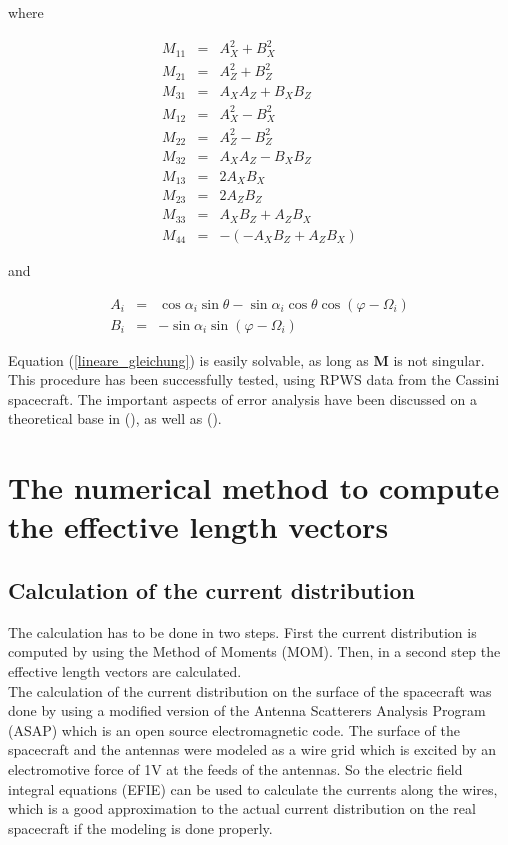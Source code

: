 \documentclass[galley,ras]{agu2001}
\begin{document}
\begin{article}
where

\begin{eqnarray}
  M_{11} &=& A^2_X+ B^2_X \\
M_{21} &=& A^2_Z+ B^2_Z \\
M_{31} &=& A_X A_Z +  B_X B_Z \\
M_{12} &=& A^2_X- B^2_X \\
M_{22} &=& A^2_Z- B^2_Z \\
M_{32} &=& A_X A_Z - B_X B_Z \\
M_{13} &=& 2 A_X B_X \\
M_{23} &=& 2 A_Z B_Z \\
M_{33} &=& A_X B_Z + A_Z B_X \\
M_{44} &=& -(-A_X B_Z + A_Z B_X )\end{eqnarray}

and

\begin{eqnarray}
A_i &=& \cos \alpha_i \sin \theta - \sin \alpha_i \cos \theta \cos (\varphi - \Omega_i)\label{A_i} \\
B_i &=& -\sin \alpha_i \sin (\varphi - \Omega_i) \label{B_i}
\end{eqnarray}


Equation (\ref{lineare_gleichung}) is easily solvable, as long as \textbf{M} is not singular. This procedure has been successfully tested, using RPWS data from the Cassini spacecraft. The important aspects of error analysis have been discussed on a theoretical base in (\cite{my_masterthesis}), as well as (\cite{DF}).\\

\section{The numerical method to compute the effective length vectors}
\subsection{Calculation of the current distribution}
The calculation  has to be done in two steps. First the current distribution is computed by using the Method of Moments (MOM). Then, in a second step the effective length vectors are calculated.\\


The calculation of the current distribution on the surface of the spacecraft was done by using a modified version of the Antenna Scatterers Analysis Program (ASAP) which is an open source electromagnetic code. The surface of the spacecraft and the antennas were modeled as a wire grid which is excited by an electromotive force of 1V at the feeds of the antennas. So the electric field integral equations (EFIE) can be used to calculate the currents along the wires, which is a good approximation to the actual current distribution on the real spacecraft if the modeling is done properly.\\


\end{article}
\end{document}
